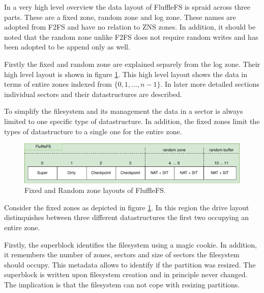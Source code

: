 In a very high level overview the data layout of FluffleFS is spraid across
three parts. These are a fixed zone, random zone and log zone. These names are
adopted from F2FS and have no relation to ZNS zones. In addition, it should be
noted that the random zone unlike F2FS does not require random writes and has
been adopted to be append only as well.

Firstly the fixed and random zone are explained separely from the log zone.
Their high level layout is shown in figure \ref{figure:flufflelayout}. This high
level layout shows the data in terms of entire zones indexed from
${\{0,1,...,n-1\}}$. In later more detailed sections individual sectors and
their datastructures are described.

To simplify the filesystem and its management the data in a sector is always
limited to one specific type of datastructure. In addition, the fixed zones
limit the types of datastructure to a single one for the entire zone.

\begin{figure}[h!]
    \centering
	\includegraphics[width=1\textwidth]{resources/images/fluffle-layout.pdf}
	\caption{Fixed and Random zone layouts of FluffleFS.}
    \label{figure:flufflelayout}
\end{figure}

Consider the fixed zones as depicted in figure \ref{figure:flufflelayout}. In
this region the drive layout distinquishes between three different
datastructures the first two occupying an entire zone.

Firstly, the superblock identifies the filesystem using a magic cookie. In
addition, it remembers the number of zones, sectors and size of sectors the
filesystem should occupy. This metadata allows to identify if the partition was
resized. The superblock is written upon filesystem creation and in principle
never changed. The implication is that the filesystem can not cope with resizing
partitions.

